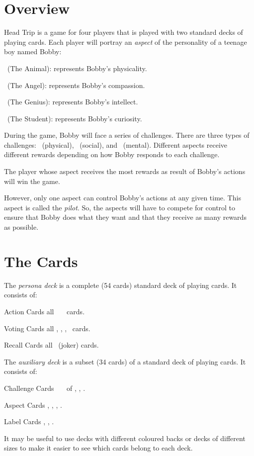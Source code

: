 \section{Overview}
Head Trip is a game for four players that is played with two standard decks of playing cards. Each player will portray an \emph{aspect} of the personality of a teenage boy named Bobby: 
\begin{playerlist}
	\item[\jack\clubs\ (The Animal):] represents Bobby's physicality.
	\item[\redqueen\hearts\ (The Angel):] represents Bobby's compassion.
	\item[\king\spades\ (The Genius):] represents Bobby's intellect.
	\item[\redace\diamonds\ (The Student):] represents Bobby's curiosity.
\end{playerlist}

During the game, Bobby will face a series of challenges.
There are three types of challenges: \clubs~(physical), \hearts~(social), and \spades~(mental). Different aspects receive different rewards depending on how Bobby responds to each challenge.

The player whose aspect receives the most rewards as result of Bobby's actions will win the game.

However, only one aspect can control Bobby's actions at any given time. This aspect is called the \emph{pilot}. So, the aspects will have to compete for control to ensure that Bobby does what they want and that they receive as many rewards as possible.

\section{The Cards}
The \emph{persona deck} is a complete (54 cards) standard deck of playing cards. It consists of:
\begin{personadecklist}
	\item[Action Cards\hfill\normalfont{(36):}] all \two\ \textendash\ \ten\ cards.
	\item[Voting Cards\hfill\normalfont{(16):}] all \jack, \queen, \king, \ace\ cards.
	\item[Recall Cards\hfill\normalfont{(2):}] all \joker\ (joker) cards.
\end{personadecklist}

The \emph{auxiliary deck} is a subset (34 cards) of a standard deck of playing cards. It consists of:
\begin{auxiliarydecklist}
	\item[Challenge Cards\hfill\normalfont{(27):}] \two\ \textendash\ \ten\ of \clubs, \hearts, \spades.
	\item[Aspect Cards\hfill\normalfont{(4):}] \jack\clubs, \queen[red]\hearts[red], \king\spades, \ace[red]\diamonds[red].
	\item[Label Cards\hfill\normalfont{(3):}] \ace\clubs, \ace[red]\hearts, \ace\spades.
\end{auxiliarydecklist}

It may be useful to use decks with different coloured backs or decks of different sizes to make it easier to see which cards belong to each deck.

